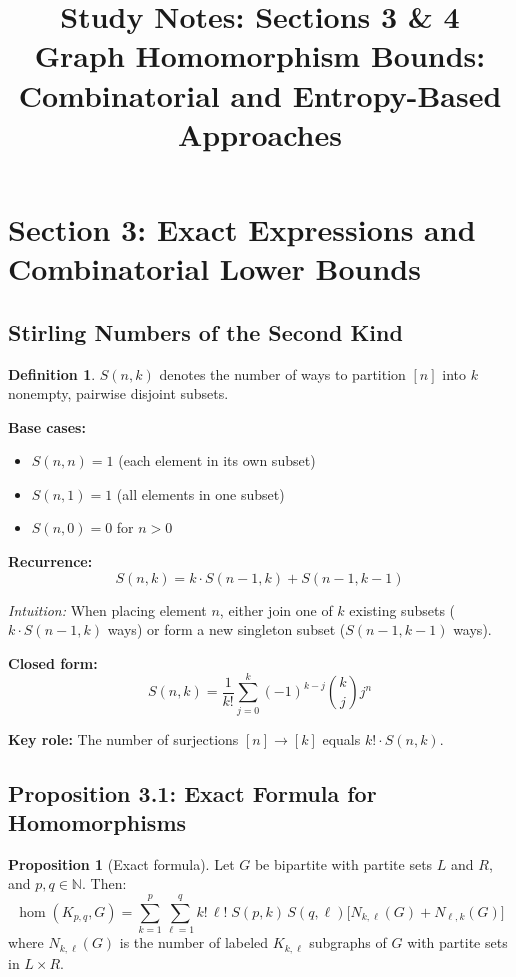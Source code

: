 \documentclass[12pt,a4paper]{article}
\title{\textbf{Study Notes: Sections 3 \& 4}\\[0.3em]
  \large Graph Homomorphism Bounds:\\
  Combinatorial and Entropy-Based Approaches}
\author{}
\date{}
\theoremstyle{definition}
\newtheorem{proposition}[theorem]{Proposition}
\newtheorem{definition}[theorem]{Definition}
\newcommand{\hom}{\operatorname{hom}}
\begin{document}
\maketitle
\tableofcontents
\newpage

\section{Section 3: Exact Expressions and Combinatorial Lower Bounds}

\subsection{Stirling Numbers of the Second Kind}

\begin{definition}
  $S(n,k)$ denotes the number of ways to partition $[n]$ into $k$ nonempty, pairwise disjoint subsets.
\end{definition}

\textbf{Base cases:}
\begin{itemize}
  \item $S(n,n) = 1$ \quad (each element in its own subset)
  \item $S(n,1) = 1$ \quad (all elements in one subset)
  \item $S(n,0) = 0$ for $n > 0$
\end{itemize}

\textbf{Recurrence:}
\[
  S(n,k) = k \cdot S(n-1,k) + S(n-1,k-1)
\]

\textit{Intuition:} When placing element $n$, either join one of $k$ existing subsets ($k \cdot S(n-1,k)$ ways) or form a new singleton subset ($S(n-1,k-1)$ ways).

\textbf{Closed form:}
\[
  S(n,k) = \frac{1}{k!} \sum_{j=0}^{k} (-1)^{k-j} \binom{k}{j} j^n
\]

\textbf{Key role:} The number of surjections $[n] \to [k]$ equals $k! \cdot S(n,k)$.

\subsection{Proposition 3.1: Exact Formula for Homomorphisms}

\begin{proposition}[Exact formula]
  Let $G$ be bipartite with partite sets $L$ and $R$, and $p,q \in \mathbb{N}$. Then:
  \[
    \hom(K_{p,q}, G) = \sum_{k=1}^{p} \sum_{\ell=1}^{q}
    k!\,\ell!\; S(p,k)\,S(q,\ell)\bigl[N_{k,\ell}(G) + N_{\ell,k}(G)\bigr]
  \]
  where $N_{k,\ell}(G)$ is the number of labeled $K_{k,\ell}$ subgraphs of $G$ with partite sets in $L \times R$.
\end{proposition}
\end{document}
